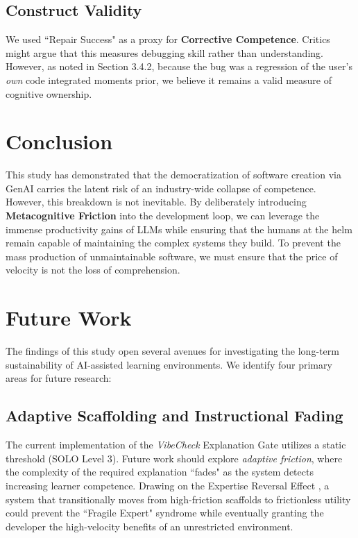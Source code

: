 \documentclass[sigconf]{acmart}
\begin{document}
\subsection{Construct Validity}
We used ``Repair Success" as a proxy for \textbf{Corrective Competence}. Critics might argue that this measures debugging skill rather than understanding. However, as noted in Section 3.4.2, because the bug was a regression of the user’s \textit{own} code integrated moments prior, we believe it remains a valid measure of cognitive ownership.

\section{Conclusion}
This study has demonstrated that the democratization of software creation via GenAI carries the latent risk of an industry-wide collapse of competence. However, this breakdown is not inevitable. By deliberately introducing \textbf{Metacognitive Friction} into the development loop, we can leverage the immense productivity gains of LLMs while ensuring that the humans at the helm remain capable of maintaining the complex systems they build. To prevent the mass production of unmaintainable software, we must ensure that the price of velocity is not the loss of comprehension.

\section{Future Work}

The findings of this study open several avenues for investigating the long-term sustainability of AI-assisted learning environments. We identify four primary areas for future research:

\subsection{Adaptive Scaffolding and Instructional Fading}
The current implementation of the \textit{VibeCheck} Explanation Gate utilizes a static threshold (SOLO Level 3). Future work should explore \textit{adaptive friction}, where the complexity of the required explanation ``fades" as the system detects increasing learner competence. Drawing on the Expertise Reversal Effect \cite{kalyuga2009expertise}, a system that transitionally moves from high-friction scaffolds to frictionless utility could prevent the ``Fragile Expert" syndrome while eventually granting the developer the high-velocity benefits of an unrestricted environment.
\end{document}
